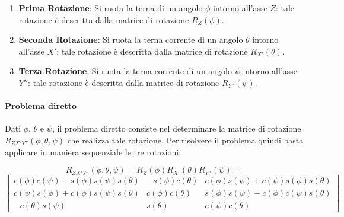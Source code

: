 \documentclass[11pt, a4paper]{report}
\begin{document}
\begin{enumerate}
    \item \textbf{Prima Rotazione}: Si ruota la terna di un angolo $\phi$ intorno all'asse $Z$: tale rotazione è descritta dalla matrice di rotazione $R_Z(\phi)$.
    \item \textbf{Seconda Rotazione}: Si ruota la terna corrente di un angolo $\theta$ intorno all'asse $X'$: tale rotazione è descritta dalla matrice di rotazione $R_{X'}(\theta)$.
    \item \textbf{Terza Rotazione}: Si ruota la terna corrente di un angolo $\psi$ intorno all'asse $Y''$: tale rotazione è descritta dalla matrice di rotazione $R_{Y''}(\psi)$.
\end{enumerate}

\paragraph{Problema diretto}

Dati $\phi$, $\theta$ e $\psi$, il problema diretto consiste nel determinare la matrice di rotazione $R_{ZX'Y''}(\phi, \theta, \psi)$ che realizza tale rotazione. Per risolvere il problema quindi basta applicare in maniera sequenziale le tre rotazioni:

\[
    R_{ZX'Y''}(\phi, \theta, \psi) = R_Z(\phi) R_{X'}(\theta) R_{Y''}(\psi) =
\]
\[
\begin{bmatrix}
    c(\phi)c(\psi) - s(\phi)s(\psi)s(\theta) & -s(\phi)c(\theta) & c(\phi)s(\psi) + c(\psi)s(\phi)s(\theta) \\
    c(\psi)s(\phi) + c(\phi)s(\psi)s(\theta) & c(\phi)c(\theta) & s(\phi)s(\psi) - c(\phi)c(\psi)s(\theta) \\
    -c(\theta)s(\psi) & s(\theta) & c(\psi)c(\theta)
\end{bmatrix}
\]
\end{document}
